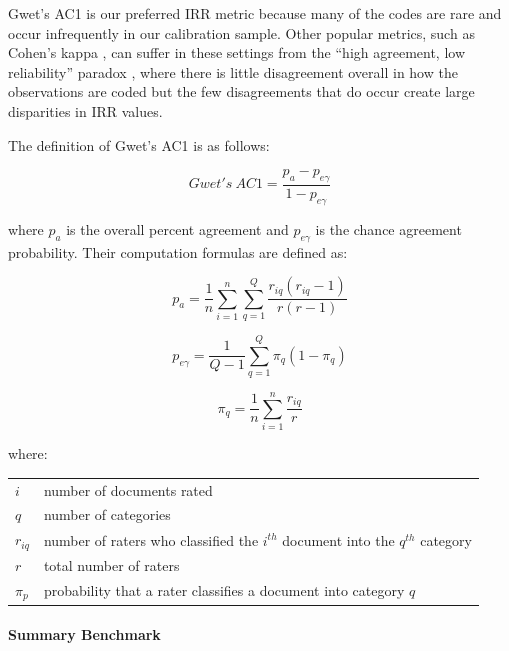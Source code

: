 \documentclass{article}
\makeatletter
\newenvironment{conditions}
  {\par\vspace{\abovedisplayskip}\noindent\begin{tabular}{>{$}l<{$} @{${}={}$} l}}
  {\end{tabular}\par\vspace{\belowdisplayskip}}
\makeatother
\begin{document}
Gwet’s AC1 \cite{gwet2008computing} is our preferred IRR metric because many of the codes are rare and occur infrequently in our calibration sample.  Other popular metrics, such as Cohen’s kappa \cite{cohen1960coefficient}, can suffer in these settings from the “high agreement, low reliability” paradox \cite{falotico2015fleiss, feng2015mistakes, zhao2013assumptions}, where there is little disagreement overall in how the observations are coded but the few disagreements that do occur create large disparities in IRR values.  %

The definition of Gwet's AC1 is as follows:

\begin{equation}
Gwet's\:AC1 = {\frac {p_a-p_{e\gamma}}{1-p_{e\gamma}}}
\end{equation}

where $p_a$ is the overall percent agreement and $p_{e\gamma}$ is the chance agreement probability.  Their computation formulas are defined as:

\begin{equation}
p_a = \frac{1}{n} \sum_{i=1}^n \sum_{q=1}^Q \frac{r_{iq}(r_{iq}-1)}{r(r-1)}
\end{equation}

\begin{equation}
p_{e\gamma} = \frac{1}{Q-1} \sum_{q=1}^Q \pi_{q}(1-\pi_{q})
\end{equation}

\begin{equation}
\pi_{q} = \frac{1}{n} \sum_{i=1}^n \frac{r_{iq}}{r}
\end{equation}

where:
\begin{conditions}
 i     &  number of documents rated \\
 q     &  number of categories \\   
 r_{iq} &  number of raters who classified the $i^{th}$ document into the $q^{th}$ category \\
 r &  total number of raters \\
 \pi_{p} & probability that a rater classifies a document into category $q$
\end{conditions}

\paragraph{Summary Benchmark}
\label{sec:bench-method}
\end{document}
